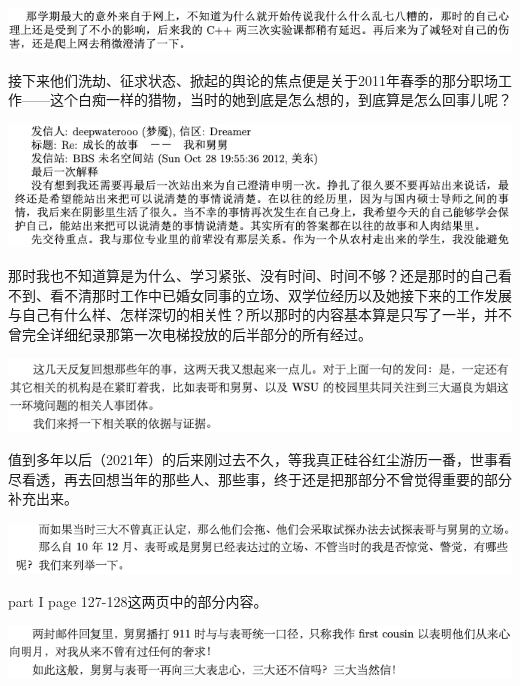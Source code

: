 \documentclass[9pt, b5paper]{article}
\begin{document}
\begin{center}
\includegraphics[width=.9\linewidth]{./pic/backups_plans_20210424_205834.png}
\end{center}

接下来他们洗劫、征求状态、掀起的舆论的焦点便是关于2011年春季的那分职场工作——这个白痴一样的猎物，当时的她到底是怎么想的，到底算是怎么回事儿呢？

\begin{center}
\includegraphics[width=.9\linewidth]{./pic/backups_plans_20210424_093531.png}
\end{center}

那时我也不知道算是为什么、学习紧张、没有时间、时间不够？还是那时的自己看不到、看不清那时工作中已婚女同事的立场、双学位经历以及她接下来的工作发展与自己有什么样、怎样深切的相关性？所以那时的内容基本算是只写了一半，并不曾完全详细纪录那第一次电梯投放的后半部分的所有经过。

\begin{center}
\includegraphics[width=.9\linewidth]{./pic/backups_plans_20210424_094006.png}
\end{center}

值到多年以后（2021年）的后来刚过去不久，等我真正硅谷红尘游历一番，世事看尽看透，再去回想当年的那些人、那些事，终于还是把那部分不曾觉得重要的部分补充出来。

\begin{center}
\includegraphics[width=.9\linewidth]{./pic/backups_plans_20210424_102201.png}
\end{center}

part I page 127-128这两页中的部分内容。

\begin{center}
\includegraphics[width=.9\linewidth]{./pic/backups_plans_20210424_102322.png}
\end{center}
\end{document}

